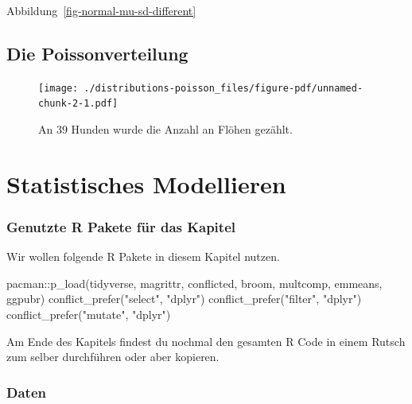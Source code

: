 \documentclass[
  letterpaper,
  DIV=11,
  oneside]{scrreport}
\newenvironment{Shaded}{\begin{snugshade}}{\end{snugshade}}
\newcommand{\FunctionTok}[1]{\textcolor[rgb]{0.28,0.35,0.67}{#1}}
\newcommand{\NormalTok}[1]{\textcolor[rgb]{0.00,0.23,0.31}{#1}}
\newcommand{\SpecialCharTok}[1]{\textcolor[rgb]{0.37,0.37,0.37}{#1}}
\newcommand{\StringTok}[1]{\textcolor[rgb]{0.13,0.47,0.30}{#1}}
\begin{document}
Abbildung~\ref{fig-normal-mu-sd-different}

\hypertarget{sec-poisson}{%
\chapter{Die Poissonverteilung}\label{sec-poisson}}

\begin{figure}

{\centering \texttt{[image: ./distributions-poisson\_files/figure-pdf/unnamed-chunk-2-1.pdf]}

}

\caption{An 39 Hunden wurde die Anzahl an Flöhen gezählt.}

\end{figure}

\part{Statistisches Modellieren}

\hypertarget{genutzte-r-pakete-fuxfcr-das-kapitel-10}{%
\section*{Genutzte R Pakete für das
Kapitel}\label{genutzte-r-pakete-fuxfcr-das-kapitel-10}}

Wir wollen folgende R Pakete in diesem Kapitel nutzen.

\begin{Shaded}
\begin{Highlighting}[]
\NormalTok{pacman}\SpecialCharTok{::}\FunctionTok{p\_load}\NormalTok{(tidyverse, magrittr, conflicted, broom,}
\NormalTok{               multcomp, emmeans, ggpubr)}
\FunctionTok{conflict\_prefer}\NormalTok{(}\StringTok{"select"}\NormalTok{, }\StringTok{"dplyr"}\NormalTok{)}
\FunctionTok{conflict\_prefer}\NormalTok{(}\StringTok{"filter"}\NormalTok{, }\StringTok{"dplyr"}\NormalTok{)}
\FunctionTok{conflict\_prefer}\NormalTok{(}\StringTok{"mutate"}\NormalTok{, }\StringTok{"dplyr"}\NormalTok{)}
\end{Highlighting}
\end{Shaded}

Am Ende des Kapitels findest du nochmal den gesamten R Code in einem
Rutsch zum selber durchführen oder aber kopieren.

\hypertarget{daten-1}{%
\section*{Daten}\label{daten-1}}
\end{document}
